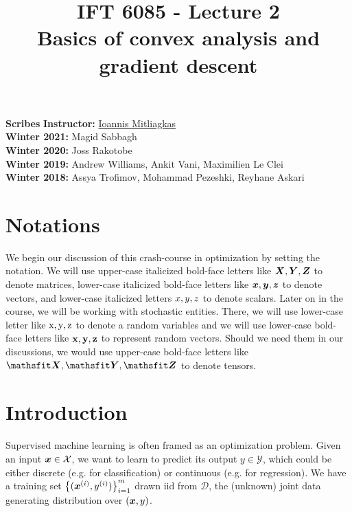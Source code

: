 \documentclass{article}
\title{IFT 6085 - Lecture 2 \\ 
Basics of convex analysis and gradient descent }
\date{}
\begin{document}
 

\maketitle


\textbf{Scribes}\hfill
\textbf{Instructor:}  {\href{https://mitliagkas.github.io/}{Ioannis Mitliagkas}}\\
\textbf{Winter 2021:} Magid Sabbagh\\
\textbf{Winter 2020:} Joss Rakotobe\\
\textbf{Winter 2019:} Andrew Williams, Ankit Vani, Maximilien Le Clei\\
\textbf{Winter 2018:} Assya Trofimov, Mohammad Pezeshki, Reyhane Askari



\newcommand{\infgc}{\inf_{g \in \mathcal{C}}}
\newcommand{\supgc}{\sup_{g \in \mathcal{C}}}

\section*{Notations}
\label{sec:notations}
We begin our discussion of this crash-course in optimization by setting the notation.
We will use upper-case italicized bold-face letters like ${\bm{X}}, {\bm{Y}}, {\bm{Z}}$ to denote matrices, lower-case italicized bold-face letters like ${\bm{x}}, {\bm{y}}, {\bm{z}}$ to denote vectors, and lower-case italicized letters ${x}, {y}, {z}$ to denote scalars.
Later on in the course, we will be working with stochastic entities.
There, we will use lower-case letter like ${\textnormal{x}}, {\textnormal{y}}, {\textnormal{z}}$ to denote a random variables and we will use lower-case bold-face letters like ${\mathbf{x}}, {\mathbf{y}}, {\mathbf{z}}$ to represent random vectors.
Should we need them in our discussions, we would use upper-case bold-face letters like $\tX, \tY, \tZ$ to denote tensors.

\section{Introduction}
\label{sec:introduction}
Supervised machine learning is often framed as an optimization problem. 
Given an input ${\bm{x}} \in \mathcal{X}$, we want to learn to predict its output $y \in \mathcal{Y}$, which could be either discrete (e.g. for classification) or continuous (e.g. for regression). 
We have a training set $\left\{ ({\bm{x}}^{(i)}, y^{(i)}) \right\}_{i=1}^m$ drawn iid from $\mathcal{D}$, the (unknown) joint data generating distribution over $({\bm{x}}, y)$.
\end{document}

